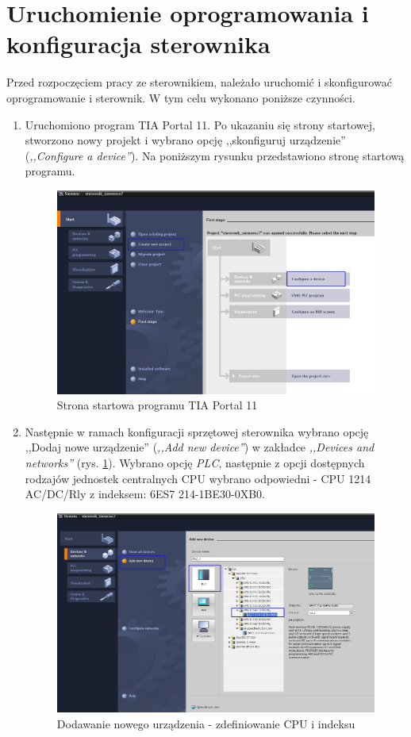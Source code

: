 \documentclass[12pt]{article}
\begin{document}
\section{Uruchomienie oprogramowania i konfiguracja sterownika}
Przed rozpoczęciem pracy ze sterownikiem, należało uruchomić i skonfigurować oprogramowanie i sterownik. W tym celu wykonano poniższe czynności.
\begin{enumerate}
    \item Uruchomiono program TIA Portal 11. Po ukazaniu się strony startowej, stworzono nowy projekt i wybrano opcję ,,skonfiguruj urządzenie'' (\textit{,,Configure a device''}). Na poniższym rysunku przedstawiono stronę startową programu.
    \begin{figure}[H]
        \centering
        \includegraphics[scale=0.3]{./zdj/strona_startowa.png}
        \caption{Strona startowa programu TIA Portal 11}
    \end{figure}

    \item Następnie w ramach konfiguracji sprzętowej sterownika wybrano opcję ,,Dodaj nowe urządzenie'' (\textit{,,Add new device''}) w zakładce \textit{,,Devices and networks''} (rys. \ref{cpu}). Wybrano opcję \textit{PLC}, następnie z opcji dostępnych rodzajów jednostek centralnych CPU wybrano odpowiedni - CPU 1214 AC/DC/Rly z indeksem: 6ES7 214-1BE30-0XB0. 
    \begin{figure}[H]
        \centering
        \includegraphics[scale=0.3]{./zdj/add_device.png}
        \caption{Dodawanie nowego urządzenia - zdefiniowanie CPU i indeksu}
        \label{cpu}
    \end{figure}


\end{enumerate}
\end{document}
